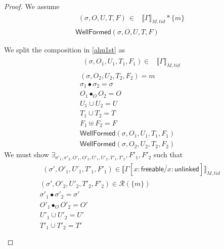  \begin{proof}
 We assume
\begin{gather}\label{ahu1st}
  \begin{aligned}
    (\sigma, O, U, T,F) \, \in &  \llbracket \Gamma \rrbracket_{M,tid} * \{m\}
    \end{aligned} \\
\textsf{WellFormed}(\sigma,O,U,T,F)
\label{ahu2st}
\end{gather}

We split the composition in  \ref{ahu1st} as 
\begin{gather} \label{ahu11st}
  \begin{aligned}
    (\sigma, O_{1}, U_{1}, T_{1},F_1 ) \in & \llbracket  \Gamma \rrbracket_{M,tid} \end{aligned}\\
  \label{ahu12st}
(\sigma, O_{2}, U_{2}, T_{2},F_2) = m
\\
\label{ahusigst}
\sigma_1 \bullet \sigma_2 = \sigma
\\
\label{ahu13st}
O_{1} \bullet_{O} O_{2} = O
\\
\label{ahu14st}
U_{1} \cup U_{2} = U
\\
\label{ahu15st}
T_{1} \cup T_{2} = T
\\
\label{ahustF}
F_1 \uplus F_2 = F
\\
\label{ahu16st}
\textsf{WellFormed}(\sigma,O_{1},U_{1},T_{1},F_1)
\\
\label{ahu17st}
\textsf{WellFormed}(\sigma,O_{2},U_{2},T_{2},F_2)
\end{gather}
We must show $\exists_{\sigma'_1, \sigma'_2, O'_{1}, O'_{2}, U'_{1}, U'_{2}, T'_{1}, T'_{2}},F'_1 ,F'_2$ such that
\begin{gather}\label{phu5st}
\begin{aligned}
(\sigma',O'_{1},U'_{1}, T'_{1},F'_1)  \in \llbracket \Gamma[\overline{x:\textsf{freeable}/x:\textsf{unlinked}}] \rrbracket_{M,tid}
\end{aligned}\\
\label{phu6st}
(\sigma',O'_{2},U'_{2}, T'_{2}, F'_2) \in \mathcal{R}(\{m\})
\\
\label{ahusigst'}
\sigma'_1 \bullet \sigma'_2 = \sigma'
\\
\label{phu7st}
O'_{1} \bullet_{O} O'_{2} = O'
\\
\label{phu8st}
U'_{1} \cup U'_{2} = U'
\\
\label{phu9st}
T'_{1} \cup T'_{2} = T'
\\
\\
\label{phustF}

\end{gather}
\end{proof}
